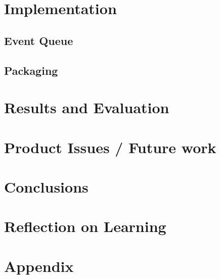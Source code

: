 \documentclass[12pt, conference, final, a4paper, onecolumn, compsoc]{IEEEtran}
\begin{document}
    \section{Implementation}
    \subsection*{Event Queue}

    \subsection*{Packaging}

    \section{Results and Evaluation}
    \subsection*{}

    \section{Product Issues / Future work} %
    \subsection*{}

    \section{Conclusions}
    \subsection*{}

    \section{Reflection on Learning} %
    \subsection*{}

    \section{Appendix}
     

  
\end{document}

